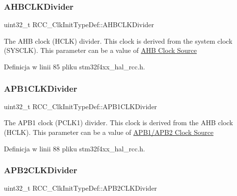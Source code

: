 \subsubsection{\texorpdfstring{A\+H\+B\+C\+L\+K\+Divider}{AHBCLKDivider}}
{\footnotesize\ttfamily uint32\+\_\+t R\+C\+C\+\_\+\+Clk\+Init\+Type\+Def\+::\+A\+H\+B\+C\+L\+K\+Divider}

The A\+HB clock (H\+C\+LK) divider. This clock is derived from the system clock (S\+Y\+S\+C\+LK). This parameter can be a value of \hyperlink{group___r_c_c___a_h_b___clock___source}{A\+HB Clock Source} 

Definicja w linii 85 pliku stm32f4xx\+\_\+hal\+\_\+rcc.\+h.

\mbox{\label{struct_r_c_c___clk_init_type_def_a21ceb024102adc3c4dc7eb270cf02ebd}} 
\subsubsection{\texorpdfstring{A\+P\+B1\+C\+L\+K\+Divider}{APB1CLKDivider}}
{\footnotesize\ttfamily uint32\+\_\+t R\+C\+C\+\_\+\+Clk\+Init\+Type\+Def\+::\+A\+P\+B1\+C\+L\+K\+Divider}

The A\+P\+B1 clock (P\+C\+L\+K1) divider. This clock is derived from the A\+HB clock (H\+C\+LK). This parameter can be a value of \hyperlink{group___r_c_c___a_p_b1___a_p_b2___clock___source}{A\+P\+B1/\+A\+P\+B2 Clock Source} 

Definicja w linii 88 pliku stm32f4xx\+\_\+hal\+\_\+rcc.\+h.

\mbox{\label{struct_r_c_c___clk_init_type_def_aa75c110cd93855d49249f38da8cf94f7}} 
\subsubsection{\texorpdfstring{A\+P\+B2\+C\+L\+K\+Divider}{APB2CLKDivider}}
{\footnotesize\ttfamily uint32\+\_\+t R\+C\+C\+\_\+\+Clk\+Init\+Type\+Def\+::\+A\+P\+B2\+C\+L\+K\+Divider}

